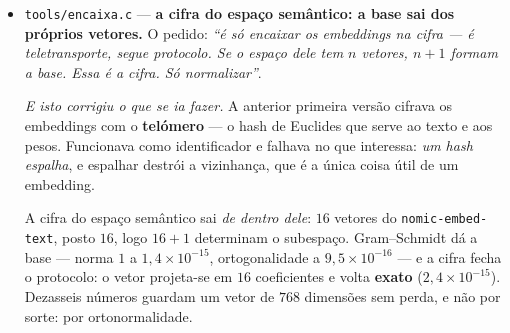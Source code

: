 \documentclass[11pt]{article}
\newcommand{\code}[1]{\texttt{\small #1}}
\theoremstyle{plain}
\theoremstyle{remark}
\begin{document}
\begin{itemize}
Quatro entram, $4{,}21$~GB, transcritos disco-a-disco em $2{,}18$~s ($1932$~MB/s): o
\code{qwen2.5:1.5b} que escreve, o \code{llama3.2:1b} que rascunha, o \code{gemma2:2b} que revê, e o
\code{nomic-embed-text} que cifra em vetor para procurar. Cada um com \textbf{lugar} (calculado, não
atribuído), \textbf{telómero} (a cifra da ponta) e \textbf{saída byte a byte} --- o genoma
\emph{inteiro} de cada um conferido contra o blob de origem, $4{,}21$~GB em $2{,}72$~s, zero
divergências. É o protocolo do \code{teletransporte.c} §X4 com uma diferença que só agora se vê:
\emph{o que atravessa já não são bytes quaisquer --- é quem responde}.

Bastam $3$ termos de telómero para separar cinco agentes, contra os $10$ que o \code{fita.c}
precisou para $338$ genes --- e a razão é a mesma lei do aniversário, $N(N{-}1)/2M$.

\emph{E a escala não fechava consigo mesma:} a primeira versão mapeava os $4{,}21$~GB inteiros para
tirar o telómero, e falhava \textbf{em silêncio} contra o \code{ulimit -v} de $4$~GB que se próprio
tinha posto --- a tabela imprimia linhas em branco e o programa não dava por isso. O telómero sai da
\emph{ponta}: $4096$ bytes por \code{pread}, e mais nada.

\textbf{O despacho não é arbitrário, e o critério é o corpus.} O \code{conversa.c} tem três métodos, e
o \textbf{decreto} (\emph{``não sei''}) é o único \emph{sem dual} --- é por isso que ele pode recusar,
e é a recusa que passa a palavra ao agente certo. \emph{Um sistema que nunca diz ``não sei'' não tem
como passar a palavra a ninguém.}

\item \code{tools/encaixa.c} --- \textbf{a cifra do espaço semântico: a base sai dos próprios
vetores.} O pedido: \emph{``é só encaixar os embeddings na cifra --- é teletransporte, segue
protocolo. Se o espaço dele tem $n$ vetores, $n{+}1$ formam a base. Essa é a cifra. Só
normalizar''}.

\emph{E isto corrigiu o que se ia fazer.} A anterior primeira versão cifrava os embeddings com o
\textbf{telómero} --- o hash de Euclides que serve ao texto e aos pesos. Funcionava como
identificador e falhava no que interessa: \emph{um hash espalha}, e espalhar destrói a vizinhança,
que é a única coisa útil de um embedding.

A cifra do espaço semântico sai \emph{de dentro dele}: $16$ vetores do \code{nomic-embed-text},
posto $16$, logo $16{+}1$ determinam o subespaço. Gram--Schmidt dá a base --- norma $1$ a
$1{,}4\times10^{-15}$, ortogonalidade a $9{,}5\times10^{-16}$ --- e a cifra fecha o protocolo: o
vetor projeta-se em $16$ coeficientes e volta \textbf{exato} ($2{,}4\times10^{-15}$). Dezasseis
números guardam um vetor de $768$ dimensões sem perda, e não por sorte: por ortonormalidade.


\end{itemize}
\end{document}
